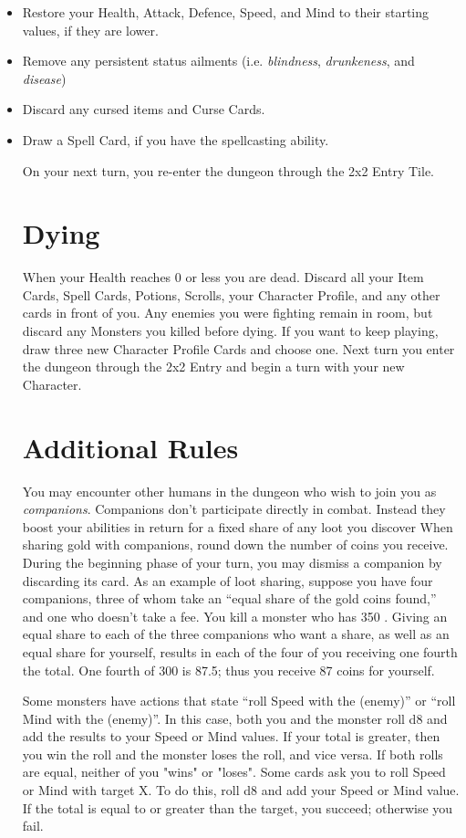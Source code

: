 \documentclass{book}
\begin{document}
\begin{itemize}
\item Restore your Health, Attack, Defence, Speed, and Mind to their starting values, if they
are lower.
\item Remove any persistent status ailments (i.e. \emph{blindness}, \emph{drunkeness}, and \emph{disease})
\item Discard any cursed items and Curse Cards.
\item Draw a Spell Card, if you have the spellcasting ability.

On your next turn, you re-enter the dungeon through the 2x2 Entry Tile.

\section{Dying} \label{dying}
When your Health reaches 0 or less you are dead. Discard all your Item Cards, Spell Cards, Potions, Scrolls, your Character Profile, and any other cards in front of you. Any enemies you were fighting remain in room, but discard any Monsters you killed before dying. If you want to keep playing, draw three new Character Profile Cards and choose one. Next turn you enter the dungeon through the 2x2 Entry and begin a turn with your new Character.

\section{Additional Rules}
You may encounter other humans in the dungeon who wish to join you as \emph{companions}. Companions don’t participate directly in combat. Instead they boost your abilities in return for a fixed share of any loot you discover When sharing gold with companions, round down the number of coins you receive. During the beginning phase of your turn, you may dismiss a companion by discarding its card.
As an example of loot sharing, suppose you have four companions, three of whom take an “equal share of the gold coins found,” and one who doesn’t take a fee. You kill a monster who has 350 . Giving an equal share to each of the three companions who want a share, as well as an equal share for yourself, results in each of the four of you receiving one fourth the total. One fourth of 300 is 87.5; thus you receive 87 coins for yourself.

Some monsters have actions that state “roll Speed with the (enemy)” or “roll Mind with the (enemy)”. In this case, both you and the monster roll d8 and add the results to your Speed or Mind values. If your total is greater, then
you win the roll and the monster loses the roll, and vice versa. If both rolls are equal, neither of you "wins" or "loses".
Some cards ask you to roll Speed or Mind with target X. To do this, roll d8 and add your Speed or Mind value. If the total is equal to or greater than the target, you succeed; otherwise you fail.


\end{itemize}
\end{document}
